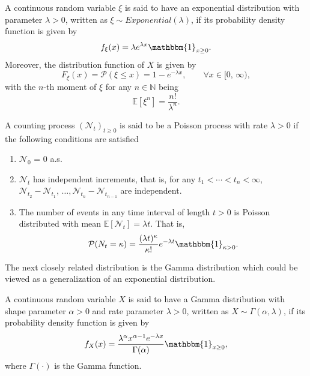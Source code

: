 \begin{definition} A continuous random variable $\xi$ is said to have an exponential distribution with parameter $\lambda > 0$, written as $\xi \sim Exponential(\lambda)$, if its probability density function is given by 
\begin{equation}
    f_\xi(x) = \lambda e^{\lambda x}\mathbbm{1}_{x\geq 0}.
\end{equation}
Moreover, the distribution function of $X$ is given by 
\begin{equation}
    F_\xi(x) = \mathcal{P}(\xi \leq x) = 1 - e^{-\lambda x}, \qquad \forall x \in [0, \, \infty),
\end{equation}
with the $n$-th moment of $\xi$ for any $n \in \mathbb{N}$ being
\begin{equation*}
    \mathbb{E}[\xi^n] = \dfrac{n!}{\lambda^n}.
\end{equation*}
\end{definition}
\begin{definition}\label{POisson_1}
A counting process $(\mathcal{N}_t)_{t \geq 0}$ is said to be a Poisson process with rate  $\lambda > 0$ if the following conditions are satisfied
\begin{enumerate}[label=(\roman*)]
     \item $\mathcal{N}_0$ = 0 a.s.
     \item $\mathcal{N}_t$ has independent increments, that is, for any $t_1 < \cdots < t_n < \infty $, \break $\mathcal{N}_{t_2} - \mathcal{N}_{t_1}, \, \ldots, \mathcal{N}_{t_n} - \mathcal{N}_{t_{n-1}}$ are independent.
     \item The number of events in any time interval of length $t > 0$ is Poisson distributed with mean $\mathbb{E}[\mathcal{N}_t] = \lambda t$. That is,
     \begin{equation}\label{pdf_poisson}
         \mathcal{P} (N_t = \kappa) = \dfrac{(\lambda t)^\kappa}{\kappa !}e^{-\lambda t}\mathbbm{1}_{ \kappa > 0}.
     \end{equation}
\end{enumerate}
\end{definition}
The next closely related distribution is the Gamma distribution which could be viewed as a generalization of an exponential distribution.
\begin{definition}
A continuous random variable $X$ is said to have a Gamma distribution with shape parameter $\alpha > 0$ and rate parameter $\lambda > 0$, written as $X \sim \Gamma(\alpha, \lambda)$, if its probability density function is given by  
\begin{equation}
    f_X(x) = \dfrac{\lambda^{\alpha} x^{\alpha-1} e^{-\lambda x}}{\Gamma (\alpha)}\mathbbm{1}_{x\geq 0},
\end{equation}
where $\Gamma (\cdot)$ is the Gamma function.
\end{definition}
